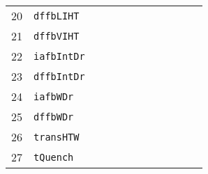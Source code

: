 \begin{table*}[!htbp]
\begin{tabular}{@{}rlrrrrrrrrrc@{}}
\footnotesize{20}  & \footnotesize{\texttt{dffbLIHT}}   &          &          &          &          &     &     & &          &     &     \\
\footnotesize{21}  & \footnotesize{\texttt{dffbVIHT}}   &          &          &          &          &     &     & &          &     &     \\
\footnotesize{22}  & \footnotesize{\texttt{iafbIntDr}}  &          &          &          &          &     &     & &          &     &     \\
\footnotesize{23}  & \footnotesize{\texttt{dffbIntDr}}  &          &          &          &          &     &     & &          &     &     \\
\footnotesize{24}  & \footnotesize{\texttt{iafbWDr}}    &          &          &          &          &     &     & &          &     &     \\
\footnotesize{25}  & \footnotesize{\texttt{dffbWDr}}    &          &          &          &          &     &     & &          &     &     \\
\footnotesize{26}  & \footnotesize{\texttt{transHTW}}   &          &          &          &          &     &     & &          &     &     \\
\footnotesize{27}  & \footnotesize{\texttt{tQuench}}    &          &          &          &          &     &     & &          &     &     \\
\bottomrule
\end{tabular}

\end{table*}


